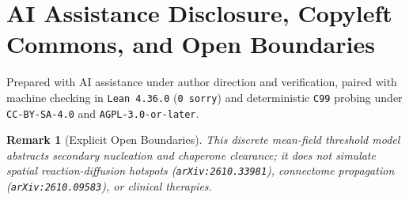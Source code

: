\documentclass[11pt,a4paper]{article}
\newtheorem{remark}{Remark}
\begin{document}
\section*{AI Assistance Disclosure, Copyleft Commons, and Open Boundaries}
Prepared with AI assistance under author direction and verification, paired with machine checking in \texttt{Lean~4.36.0} (\texttt{0~sorry}) and deterministic \texttt{C99} probing under \texttt{CC-BY-SA-4.0} and \texttt{AGPL-3.0-or-later}.

\begin{remark}[Explicit Open Boundaries]
This discrete mean-field threshold model abstracts secondary nucleation and chaperone clearance; it does not simulate spatial reaction-diffusion hotspots (\texttt{arXiv:2610.33981}), connectome propagation (\texttt{arXiv:2610.09583}), or clinical therapies.
\end{remark}
\end{document}
